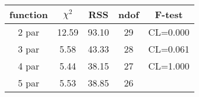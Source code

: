 \begin{tabular}{c|c|c|c|c}
function & $\chi^2$ & RSS & ndof & F-test \\
\hline
2 par & 12.59 & 93.10 & 29 & CL=0.000 \\
3 par & 5.58 & 43.33 & 28 & CL=0.061 \\
4 par & 5.44 & 38.15 & 27 & CL=1.000 \\
5 par & 5.53 & 38.85 & 26 & \\
\hline
\end{tabular}
